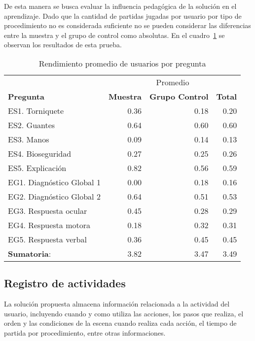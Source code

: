 De esta manera se busca evaluar la influencia pedagógica  de la solución en el
aprendizaje. Dado que la cantidad de partidas jugadas por usuario por tipo de
procedimiento no es considerada suficiente no se pueden considerar las
diferencias entre la muestra y el grupo de control como absolutas. En el
cuadro~\ref{tab:objetiva_rendimiento_por_pregunta} se observan los resultados de
esta prueba. %

\begin{table}[H]
\centering
\caption{Rendimiento promedio de usuarios por pregunta}
\begin{tabular}{lrrr}
\toprule
& \multicolumn{3}{c}{Promedio} \\
\cmidrule(lr){2-4}
\textbf{Pregunta} & 
\textbf{Muestra} & 
\textbf{Grupo Control} & 
\textbf{Total} \\ 
\midrule
ES1. Torniquete           & 0.36 & 0.18 & 0.20 \\
ES2. Guantes              & 0.64 & 0.60 & 0.60 \\
ES3. Manos                & 0.09 & 0.14 & 0.13 \\
ES4. Bioseguridad         & 0.27 & 0.25 & 0.26 \\
ES5. Explicación          & 0.82 & 0.56 & 0.59 \\
\midrule
EG1. Diagnóstico Global 1 & 0.00 & 0.18 & 0.16 \\
EG2. Diagnóstico Global 2 & 0.64 & 0.51 & 0.53 \\
EG3. Respuesta ocular     & 0.45 & 0.28 & 0.29 \\
EG4. Respuesta motora     & 0.18 & 0.32 & 0.31 \\
EG5. Respuesta verbal     & 0.36 & 0.45 & 0.45 \\
\midrule
\textbf{Sumatoria}: & 3.82 & 3.47 & 3.49  \\
\bottomrule
\end{tabular}

\label{tab:objetiva_rendimiento_por_pregunta}
\end{table}

\subsection{Registro de actividades}

La solución propuesta almacena información relacionada a la actividad del
usuario, incluyendo cuando y como utiliza las acciones, los pasos que realiza,
el orden y las condiciones de la escena cuando realiza cada acción, el tiempo de partida por procedimiento, entre otras informaciones.

